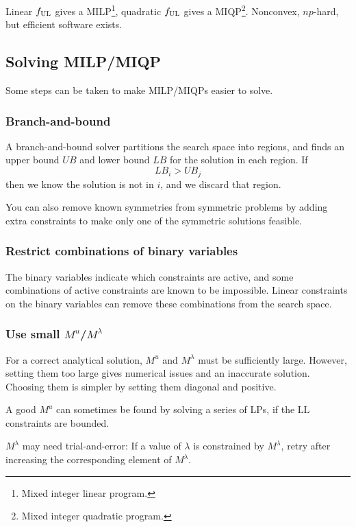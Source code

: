 Linear $f_\mathrm{UL}$ gives a MILP\footnote{Mixed integer linear program.}, quadratic $f_\mathrm{UL}$ gives a MIQP\footnote{Mixed integer quadratic program.}. Nonconvex, $np$-hard, but efficient software exists.

\subsection{Solving MILP/MIQP}
Some steps can be taken to make MILP/MIQPs easier to solve.

\subsubsection{Branch-and-bound}
A branch-and-bound solver partitions the search space into regions, and finds an upper bound $UB$ and lower bound $LB$ for the solution in each region. If
\begin{equation}
    LB_i > UB_j
\end{equation}
then we know the solution is not in $i$, and we discard that region.

You can also remove known symmetries from symmetric problems by adding extra constraints to make only one of the symmetric solutions feasible.

\subsubsection{Restrict combinations of binary variables}
The binary variables indicate which constraints are active, and some combinations of active constraints are known to be impossible. Linear constraints on the binary variables can remove these combinations from the search space.

\subsubsection{Use small $M^u$/$M^\lambda$}
For a correct analytical solution, $M^u$ and $M^\lambda$ must be sufficiently large. However, setting them too large gives numerical issues and an inaccurate solution. Choosing them is simpler by setting them diagonal and positive.

A good $M^u$ can sometimes be found by solving a series of LPs, if the LL constraints are bounded.

$M^\lambda$ may need trial-and-error: If a value of $\lambda$ is constrained by $M^\lambda$, retry after increasing the corresponding element of $M^\lambda$.
